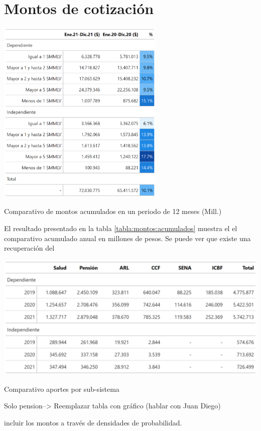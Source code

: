 \section{Montos de cotización}

\begin{table}
\includegraphics[width = 8cm]{results/03_financiero/salida_montos_cotizacion_interes_coomparativo.png}
\caption{Comparativo de montos acumulados en un periodo de 12
meses (Mill.)}
\label{tabla:montos:acumulados}
\end{table}

El resultado presentado en la tabla \ref{tabla:montos:acumulados} muestra el el comparativo acumulado anual en millones de pesos. Se puede ver que existe una recuperación del 

\lipsum[2-4]


\begin{table}[!h]
\centering
\includegraphics[width = 15cm]{results/03_financiero/salida_montos_cotizacion_subsistema.png}
\caption{Comparativo aportes por sub-sistema}%
\label{tabla:montos:sub_sistemas}
\end{table}



Solo pension--> Reemplazar tabla con gráfico (hablar con Juan Diego) 

incluir los montos a través de densidades de probabilidad. 


